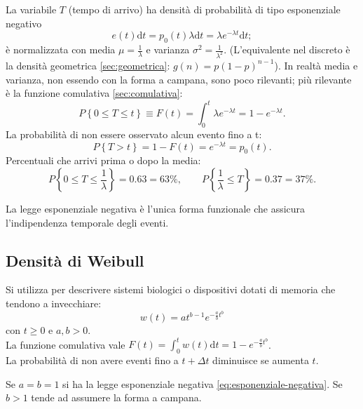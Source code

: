 La variabile $T$ (tempo di arrivo) ha densità di probabilità di tipo esponenziale negativo
\begin{equation}
\label{eq:esponenziale-negativa}
e\left( t \right) \textrm{d}t={ p }_{ 0 }\left( t \right) \lambda \textrm{d}t=\lambda { e }^{ -\lambda t }\textrm{d}t;
\end{equation}
è normalizzata con media $\mu =\frac { 1 }{ \lambda  } $ e varianza ${ \sigma  }^{ 2 }=\frac { 1 }{ { \lambda  }^{ 2 } } $. (L'equivalente nel discreto è la densità geometrica \ref{sec:geometrica}: $g(n)=p(1-p)^{n-1}$). In realtà media e varianza, non essendo con la forma a campana, sono poco rilevanti; più rilevante è la funzione comulativa \ref{sec:comulativa}:
\begin{equation}
P\left\{ 0\le T\le t \right\} \equiv F\left( t \right) =\int _{ 0 }^{ t }{ \lambda { e }^{ -\lambda t } } =1-{ e }^{ -\lambda t }.
\end{equation}
La probabilità di non essere osservato alcun evento fino a t:
\begin{equation}
P\left\{ T>t \right\} =1-F\left( t \right) ={ e }^{ -\lambda t }={ p }_{ 0 }\left( t \right) .
\end{equation}
Percentuali che arrivi prima o dopo la media:
\[
P\left\{ 0\le T\le \frac { 1 }{ \lambda  }  \right\} =0.63=63\%, \qquad  P\left\{ \frac { 1 }{ \lambda  } \le T \right\} =0.37=37\%.
\]

La legge esponenziale negativa è l'unica forma funzionale che assicura l'indipendenza temporale degli eventi.

\subsection{Densità di Weibull} %
\label{subsec:weibull}
Si utilizza per descrivere sistemi biologici o dispositivi dotati di memoria che tendono a invecchiare:
\begin{equation}
\label{eq:weibull}
w\left( t \right) =a{ t }^{ b-1 }{ e }^{ -\frac { a }{ b } { t }^{ b } }
\end{equation}
con $t\ge 0$ e $a,b>0$. \\ La funzione comulativa vale $F\left( t \right) =\int _{ 0 }^{ t }{ w\left( t \right) \textrm{d}t } =1-{ e }^{ -\frac { a }{ b } { t }^{ b } }$. \\ La probabilità di non avere eventi fino a $t+\Delta t$ diminuisce se aumenta $t$.

Se $a=b=1$ si ha la legge esponenziale negativa \ref{eq:esponenziale-negativa}. Se $b>1$ tende ad assumere la forma a campana.

